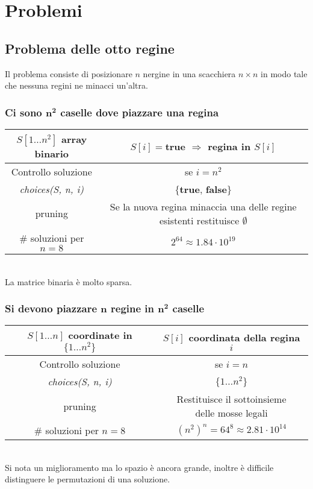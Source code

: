 \section{Problemi}
\subsection{Problema delle otto regine}
Il problema consiste di posizionare $n$ nergine in una scacchiera $n\times n$ in modo tale che nessuna regini ne minacci un'altra.
\subsubsection{Ci sono $\mathbf{n^2}$ caselle dove piazzare una regina}
\begin{tabular}{|c|c|}
	\hline
	$S[1\dots n^2]$ array binario & $S[i]=$\textbf{true} $\Rightarrow$ regina in $S[i]$ \\
	\hline
	Controllo soluzione & se $i = n^2$ \\
	\hline
	\emph{choices(S, n, i)} & $\{$\textbf{true}, \textbf{false}$\}$\\
	\hline
	pruning & \makecell{Se la nuova regina minaccia una delle \\regine esistenti restituisce $\emptyset$}\\
	\hline
	$\#$ soluzioni per $n=8$ & $2^{64}\approx 1.84\cdot 10^{19}$\\
	\hline
\end{tabular}\\
La matrice binaria \`e molto sparsa.
\subsubsection{Si devono piazzare $\mathbf{n}$ regine in $\mathbf{n^2}$ caselle}
\begin{tabular}{|c|c|}
	\hline
	$S[1\dots n]$ coordinate in $\{1\dots n^2\}$ & $S[i]$ coordinata della regina $i$\\
	\hline
	Controllo soluzione & se $i = n$ \\
	\hline
	\emph{choices(S, n, i)} & $\{1\dots n^2\}$\\
	\hline
	pruning & \makecell{Restituisce il sottoinsieme\\ delle mosse legali}\\
	\hline
	$\#$ soluzioni per $n=8$ & $(n^2)^n = 64^{8}\approx 2.81\cdot 10^{14}$\\
	\hline
\end{tabular}\\
Si nota un miglioramento ma lo spazio \`e ancora grande, inoltre \`e difficile distinguere le permutazioni di una soluzione.
